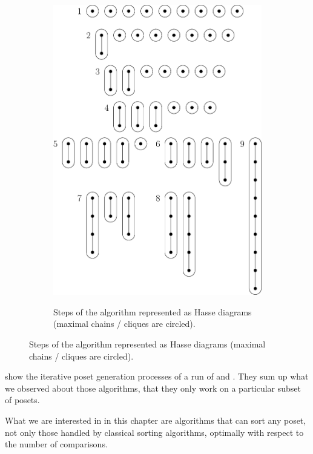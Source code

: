 \begin{figure}
\begin{subfigure}[t]{0.4\textwidth}
{\includegraphics[width=\textwidth]{fig/supi/mergesort}} \caption{Steps of the
\mergesort algorithm represented as Hasse diagrams (maximal chains / cliques are
circled).} \label{fig:supi:mergesort} \end{subfigure} \end{figure}


 show the iterative poset
generation processes of a run of \quicksort and \mergesort. They sum up what we
observed about those algorithms, that they only work on a particular subset of
posets.

What we are interested in in this chapter are algorithms that can sort any
poset, \ie not only those handled by classical sorting algorithms, optimally
with respect to the number of comparisons.
